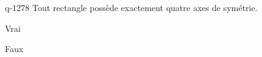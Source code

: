 \begin{truefalse}{q-1278}
Tout rectangle possède exactement quatre axes de symétrie.
\item Vrai
\item* Faux
\end{truefalse}

